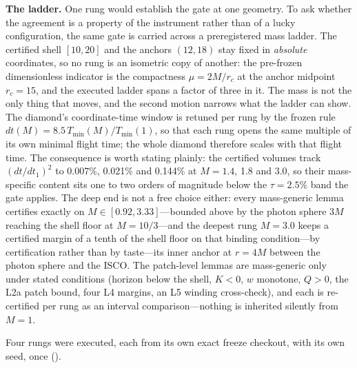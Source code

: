 \textbf{The ladder.} One rung would establish the gate at one geometry. To
ask whether the agreement is a property of the instrument rather than of a
lucky configuration, the same gate is carried across a preregistered mass
ladder. The certified shell $[10, 20]$ and the anchors $(12, 18)$ stay
fixed in \emph{absolute} coordinates, so no rung
is an isometric copy of another: the pre-frozen dimensionless indicator is
the compactness $\mu = 2M/r_c$ at the anchor midpoint $r_c = 15$, and the
executed ladder spans a factor of three in it. The mass is not the only thing
that moves, and the second motion narrows what the ladder can show. The
diamond's coordinate-time window is retuned per rung by the
frozen rule $dt(M) = 8.5\,T_{\mathrm{min}}(M)/T_{\mathrm{min}}(1)$, so that
each rung opens the same multiple of its own minimal flight time; the whole
diamond therefore scales with that flight time. The consequence is worth
stating plainly: the certified
volumes track $(dt/dt_1)^2$ to 0.007\%, 0.021\% and 0.144\% at $M = 1.4$, 1.8
and 3.0, so their mass-specific content sits one to two orders of magnitude
below the $\tau = 2.5\%$ band the gate applies. The deep end is not a free
choice either: every mass-generic lemma certifies exactly on
$M \in [0.92, 3.33]$---bounded above by the photon sphere $3M$ reaching the
shell floor at $M = 10/3$---and the deepest rung $M = 3.0$ keeps a certified
margin of a tenth of the shell floor on that binding condition---by
certification rather than by taste---its inner
anchor at $r = 4M$ between the photon sphere and the ISCO. The patch-level
lemmas are mass-generic only under stated conditions (horizon below the
shell, $K < 0$, $w$ monotone, $Q > 0$, the L2a patch bound, four L4 margins,
an L5 winding cross-check), and each is re-certified per rung as an interval
comparison---nothing is inherited silently from $M = 1$.

Four rungs were executed, each from its own exact freeze checkout, with its
own seed, once ().

